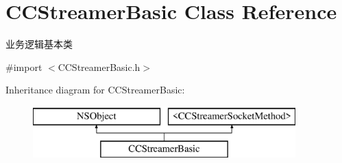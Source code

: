 \hypertarget{interface_c_c_streamer_basic}{}\section{C\+C\+Streamer\+Basic Class Reference}
\label{interface_c_c_streamer_basic}


业务逻辑基本类  




{\ttfamily \#import $<$C\+C\+Streamer\+Basic.\+h$>$}

Inheritance diagram for C\+C\+Streamer\+Basic\+:\begin{figure}[H]
\begin{center}
\leavevmode
\includegraphics[height=2.000000cm]{interface_c_c_streamer_basic}
\end{center}
\end{figure}
